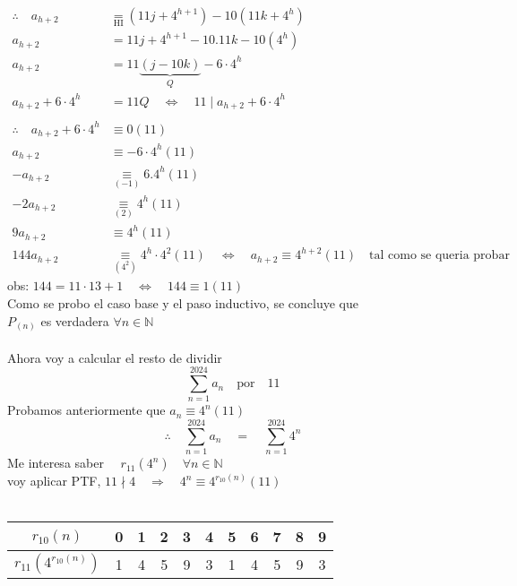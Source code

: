 \documentclass[a4paper]{article}
\begin{document}
\begin{align*}  
\therefore \quad a_{h+2} &\underset{\scriptscriptstyle\text{HI}}{=} (11j + 4^{h+1}) - 10(11k + 4^h) \\
    a_{h+2} &= 11j + 4^{h+1} - 10.11k - 10(4^h) \\
    a_{h+2} &= 11 \underbrace{(j - 10k)}_{Q} - 6 \cdot 4^h \\
    a_{h+2} +6 \cdot 4^h &= 11Q \quad \Longleftrightarrow \quad 11 \mid a_{h+2} +6 \cdot 4^h \\ \\
    \therefore \quad a_{h+2} +6 \cdot 4^h &\equiv 0 (11)\\
    a_{h+2} &\equiv -6 \cdot 4^h (11) \\
    -a_{h+2} &\underset{\scriptscriptstyle(-1)}{\equiv}  6.4^h (11) \\
    -2a_{h+2} &\underset{\scriptscriptstyle(2)}{\equiv} 4^h (11) \\
    9a_{h+2} &\equiv 4^h (11) \\
    144a_{h+2} &\underset{\scriptscriptstyle(4^2)}{\equiv}  4^h \cdot 4^2 (11) \quad
    \Longleftrightarrow \quad  a_{h+2} \equiv 4^{h+2} (11) \quad 
    \text{tal como se queria probar} 
\end{align*}
obs: $144 = 11 \cdot 13 + 1 \quad \Longleftrightarrow   \quad 144 \equiv 1 (11)$ \\
Como se probo el caso base y el paso inductivo, se concluye que \\
$P_{(n)}$ es verdadera $\forall n \in \mathbb{N}$ \\ \\
Ahora voy a calcular el resto de dividir \\
\begin{equation*}
\sum_{n=1}^{2024} a_n \quad \text{por} \quad 11
\end{equation*}
Probamos anteriormente  que $a_n \equiv 4^n (11)$ \\
\begin{equation*}
\therefore \quad \sum_{n=1}^{2024}a_n  \quad = \quad  \sum_{n=1}^{2024} 4^n
\end{equation*}
Me interesa saber $ \quad r_{\scriptscriptstyle 11} (4^n)  \quad \forall n \in \mathbb{N}$ \\
voy aplicar PTF, $11 \nmid 4 \quad \Longrightarrow \quad 4^n \equiv 4^{r_{\scriptscriptstyle 10} (n)} (11)$ \\ \\
\begin{tabular}{|c|c|c|c|c|c|c|c|c|c|c|}
    \hline
    $r_{10}(n) $ & 0 & 1 & 2 & 3 & 4 & 5 & 6 & 7 & 8 & 9 \\
    \hline
    $r_{11}(4^{r_{10}(n)})$ & 1 & 4 & 5 & 9 & 3 & 1 & 4 & 5 & 9 & 3 \\
    \hline
\end{tabular} \\ \\ \\
\end{document}
